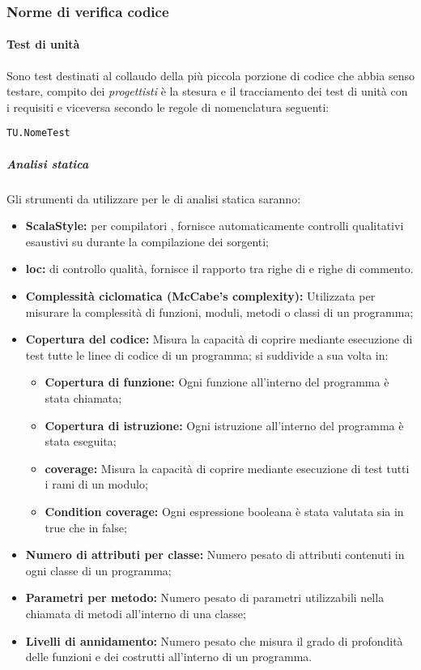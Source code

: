 \documentclass{scalatekids-article}
\begin{document}
\subsubsection{Norme di verifica codice}
\label{sec:NormeDiVerifica}

\paragraph{Test di unità}

Sono test destinati al collaudo della più piccola porzione di codice che abbia senso
testare, compito dei \textit{progettisti} è la stesura e il tracciamento dei test di
unità con i requisiti e viceversa secondo le regole di nomenclatura seguenti:

\begin{center}
  \verb=TU.NomeTest=
\end{center}

\subparagraph{Analisi statica}
\label{sec:AnalisiStatica}

Gli strumenti da utilizzare per le  di analisi statica saranno:
\begin{itemize}
\item\textbf{ScalaStyle:}  per compilatori , fornisce automaticamente controlli qualitativi esaustivi su  durante la compilazione dei sorgenti;
\item\textbf{loc:}  di controllo qualità, fornisce il rapporto tra righe di  e righe di commento.
\item\textbf{Complessità ciclomatica (McCabe's complexity):} Utilizzata per
  misurare la complessità di funzioni, moduli, metodi o classi di un
  programma;
\item\textbf{Copertura del codice:} Misura la capacità di coprire mediante
  esecuzione di test tutte le linee di codice di un programma; si
  suddivide a sua volta in:
  \begin{itemize}
  \item\textbf{Copertura di funzione:} Ogni funzione all'interno del
    programma è stata chiamata;
  \item\textbf{Copertura di istruzione:} Ogni istruzione all'interno
    del programma è stata eseguita;
  \item\textbf{ coverage:} Misura la capacità di coprire
    mediante esecuzione di test tutti i rami di un modulo;
  \item\textbf{Condition coverage:} Ogni espressione booleana è stata
    valutata sia in true che in false;
  \end{itemize}
\item\textbf{Numero di attributi per classe:} Numero pesato di attributi
  contenuti in ogni classe di un programma;
\item\textbf{Parametri per metodo:} Numero pesato di parametri utilizzabili
  nella chiamata di metodi all'interno di una classe;
\item\textbf{Livelli di annidamento:} Numero pesato che misura il grado di
  profondità delle funzioni e dei costrutti all'interno di un programma.
\end{itemize}
\end{document}
